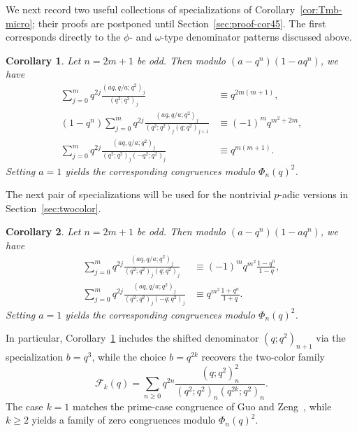 \documentclass[reqno]{amsart}
\theoremstyle{definition}
\theoremstyle{plain}
\newtheorem{corollary}{Corollary}
\theoremstyle{remark}
\newcommand{\Fk}{\mathcal{F}_k}
\numberwithin{equation}{section}
\begin{document}
We next record two useful collections of specializations of Corollary~\ref{cor:Tmb-micro}; their proofs are postponed until Section~\ref{sec:proof-cor45}. The first corresponds directly to the $\phi$- and $\omega$-type denominator patterns discussed above.

\begin{corollary}\label{cor:mock-specializations}
Let $n=2m+1$ be odd. Then modulo $(a-q^n)(1-aq^n)$, we have
\begin{align}
\sum_{j=0}^{m} q^{2j}\frac{(aq,q/a;q^2)_j}{(q^2;q^2)_j}
&\equiv q^{2m(m+1)}, \label{eq:b0-micro}\\
(1-q^n)\sum_{j=0}^{m} q^{2j}\frac{(aq,q/a;q^2)_j}{(q^2;q^2)_j(q;q^2)_{j+1}}
&\equiv (-1)^m q^{m^2+2m}, \label{eq:q3-micro}\\
\sum_{j=0}^{m} q^{2j}\frac{(aq,q/a;q^2)_j}{(q^2;q^2)_j(-q^2;q^2)_j}
&\equiv q^{m(m+1)}. \label{eq:bminusq2-micro}
\end{align}
Setting $a=1$ yields the corresponding congruences modulo $\Phi_n(q)^2$.
\end{corollary}

The next pair of specializations will be used for the nontrivial $p$-adic versions in Section~\ref{sec:twocolor}.

\begin{corollary}\label{cor:aux-specializations}
Let $n=2m+1$ be odd. Then modulo $(a-q^n)(1-aq^n)$, we have
\begin{align}
\sum_{j=0}^{m} q^{2j}\frac{(aq,q/a;q^2)_j}{(q^2;q^2)_j(q;q^2)_j}
&\equiv (-1)^m q^{m^2}\frac{1-q^n}{1-q},\label{eq:bq-micro}\\
\sum_{j=0}^{m} q^{2j}\frac{(aq,q/a;q^2)_j}{(q^2;q^2)_j(-q;q^2)_j}
&\equiv q^{m^2}\frac{1+q^n}{1+q}.\label{eq:bminusq-micro}
\end{align}
Setting $a=1$ yields the corresponding congruences modulo $\Phi_n(q)^2$.
\end{corollary}

In particular, Corollary~\ref{cor:mock-specializations} includes the shifted denominator $(q;q^2)_{n+1}$ via the specialization $b=q^3$, while the choice $b=q^{2k}$ recovers the two-color family
\[
\Fk(q)=\sum_{n\ge 0} q^{2n}\frac{(q;q^2)_n^2}{(q^2;q^2)_n(q^{2k};q^2)_n}.
\]
The case $k=1$ matches the prime-case congruence of Guo and Zeng~\cite[Theorem~1.6]{guo-zeng}, while $k\ge 2$ yields a family of zero congruences modulo $\Phi_n(q)^2$.
\end{document}
